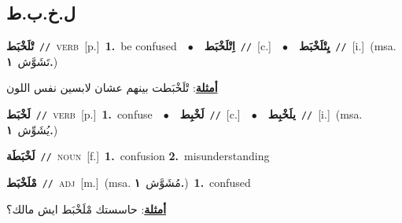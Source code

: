 \documentclass[10pt,a4paper,twoside]{article} %
\begin{document}
\begin{multicols}{2}
\vspace{-3mm}
\subsection*{\color{blue}\foreignlanguage{arabic}{ل.خ.ب.ط}\color{blue}{}} 

{\setlength\topsep{0pt}\textbf{\foreignlanguage{arabic}{تْلَخْبَط}}\ {\color{gray}\texttt{//}\color{black}}\ \textsc{verb}\ [p.]\ \textbf{1.}~be confused\ \ $\bullet$\ \ \setlength\topsep{0pt}\textbf{\foreignlanguage{arabic}{اِتْلَخْبَط}}\ {\color{gray}\texttt{//}\color{black}}\ [c.]\ \ $\bullet$\ \ \setlength\topsep{0pt}\textbf{\foreignlanguage{arabic}{يِتْلَخْبَط}}\ {\color{gray}\texttt{//}\color{black}}\ [i.]\ \color{gray}(msa. \foreignlanguage{arabic}{تَشَوَّش}~\foreignlanguage{arabic}{\textbf{١.}})\color{black}\  \begin{flushright}\color{gray}\foreignlanguage{arabic}{\textbf{\underline{\foreignlanguage{arabic}{أمثلة}}}: تْلَخْبَطت بينهم عشان لابسين نفس اللون}\end{flushright}\color{black}} \vspace{2mm}

{\setlength\topsep{0pt}\textbf{\foreignlanguage{arabic}{لَخْبَط}}\ {\color{gray}\texttt{//}\color{black}}\ \textsc{verb}\ [p.]\ \textbf{1.}~confuse\ \ $\bullet$\ \ \setlength\topsep{0pt}\textbf{\foreignlanguage{arabic}{لَخْبِط}}\ {\color{gray}\texttt{//}\color{black}}\ [c.]\ \ $\bullet$\ \ \setlength\topsep{0pt}\textbf{\foreignlanguage{arabic}{يلَخْبِط}}\ {\color{gray}\texttt{//}\color{black}}\ [i.]\ \color{gray}(msa. \foreignlanguage{arabic}{يُشَوِّش}~\foreignlanguage{arabic}{\textbf{١.}})\color{black}\ } \vspace{2mm}

{\setlength\topsep{0pt}\textbf{\foreignlanguage{arabic}{لَخْبَطَة}}\ {\color{gray}\texttt{//}\color{black}}\ \textsc{noun}\ [f.]\ \textbf{1.}~confusion  \textbf{2.}~misunderstanding\ } \vspace{2mm}

{\setlength\topsep{0pt}\textbf{\foreignlanguage{arabic}{مْلَخْبَط}}\ {\color{gray}\texttt{//}\color{black}}\ \textsc{adj}\ [m.]\ \color{gray}(msa. \foreignlanguage{arabic}{مُشَوَّش}~\foreignlanguage{arabic}{\textbf{١.}})\color{black}\ \textbf{1.}~confused\  \begin{flushright}\color{gray}\foreignlanguage{arabic}{\textbf{\underline{\foreignlanguage{arabic}{أمثلة}}}: حاسستك مْلَخْبَط ايش مالك؟}\end{flushright}\color{black}} \vspace{2mm}


\end{multicols}
\end{document}
